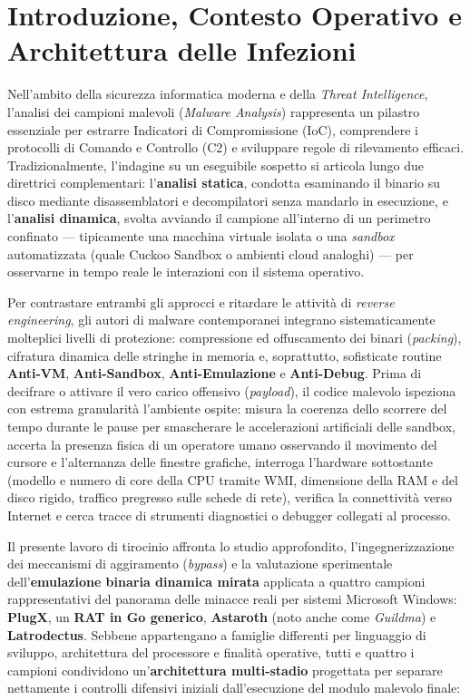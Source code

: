 \documentclass[11pt, a4paper]{article}
\begin{document}
\section{Introduzione, Contesto Operativo e Architettura delle Infezioni}

Nell'ambito della sicurezza informatica moderna e della \textit{Threat Intelligence}, l'analisi dei campioni malevoli (\textit{Malware Analysis}) rappresenta un pilastro essenziale per estrarre Indicatori di Compromissione (IoC), comprendere i protocolli di Comando e Controllo (C2) e sviluppare regole di rilevamento efficaci. Tradizionalmente, l'indagine su un eseguibile sospetto si articola lungo due direttrici complementari: l'\textbf{analisi statica}, condotta esaminando il binario su disco mediante disassemblatori e decompilatori senza mandarlo in esecuzione, e l'\textbf{analisi dinamica}, svolta avviando il campione all'interno di un perimetro confinato --- tipicamente una macchina virtuale isolata o una \textit{sandbox} automatizzata (quale Cuckoo Sandbox o ambienti cloud analoghi) --- per osservarne in tempo reale le interazioni con il sistema operativo.

Per contrastare entrambi gli approcci e ritardare le attivit\`a di \textit{reverse engineering}, gli autori di malware contemporanei integrano sistematicamente molteplici livelli di protezione: compressione ed offuscamento dei binari (\textit{packing}), cifratura dinamica delle stringhe in memoria e, soprattutto, sofisticate routine \textbf{Anti-VM}, \textbf{Anti-Sandbox}, \textbf{Anti-Emulazione} e \textbf{Anti-Debug}. Prima di decifrare o attivare il vero carico offensivo (\textit{payload}), il codice malevolo ispeziona con estrema granularit\`a l'ambiente ospite: misura la coerenza dello scorrere del tempo durante le pause per smascherare le accelerazioni artificiali delle sandbox, accerta la presenza fisica di un operatore umano osservando il movimento del cursore e l'alternanza delle finestre grafiche, interroga l'hardware sottostante (modello e numero di core della CPU tramite WMI, dimensione della RAM e del disco rigido, traffico pregresso sulle schede di rete), verifica la connettivit\`a verso Internet e cerca tracce di strumenti diagnostici o debugger collegati al processo.

Il presente lavoro di tirocinio affronta lo studio approfondito, l'ingegnerizzazione dei meccanismi di aggiramento (\textit{bypass}) e la valutazione sperimentale dell'\textbf{emulazione binaria dinamica mirata} applicata a quattro campioni rappresentativi del panorama delle minacce reali per sistemi Microsoft Windows: \textbf{PlugX}, un \textbf{RAT in Go generico}, \textbf{Astaroth} (noto anche come \textit{Guildma}) e \textbf{Latrodectus}. Sebbene appartengano a famiglie differenti per linguaggio di sviluppo, architettura del processore e finalit\`a operative, tutti e quattro i campioni condividono un'\textbf{architettura multi-stadio} progettata per separare nettamente i controlli difensivi iniziali dall'esecuzione del modulo malevolo finale:
\end{document}
